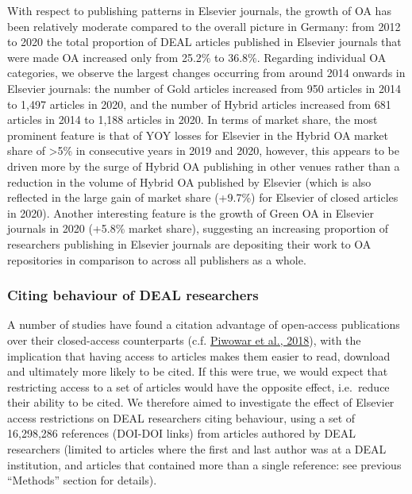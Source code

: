 \documentclass[
]{article}
\begin{document}
With respect to publishing patterns in Elsevier journals, the growth of OA has been relatively moderate compared to the overall picture in Germany: from 2012 to 2020 the total proportion of DEAL articles published in Elsevier journals that were made OA increased only from 25.2\% to 36.8\%. Regarding individual OA categories, we observe the largest changes occurring from around 2014 onwards in Elsevier journals: the number of Gold articles increased from 950 articles in 2014 to 1,497 articles in 2020, and the number of Hybrid articles increased from 681 articles in 2014 to 1,188 articles in 2020. In terms of market share, the most prominent feature is that of YOY losses for Elsevier in the Hybrid OA market share of \textgreater5\% in consecutive years in 2019 and 2020, however, this appears to be driven more by the surge of Hybrid OA publishing in other venues rather than a reduction in the volume of Hybrid OA published by Elsevier (which is also reflected in the large gain of market share (+9.7\%) for Elsevier of closed articles in 2020). Another interesting feature is the growth of Green OA in Elsevier journals in 2020 (+5.8\% market share), suggesting an increasing proportion of researchers publishing in Elsevier journals are depositing their work to OA repositories in comparison to across all publishers as a whole.

\hypertarget{citing-behaviour-of-deal-researchers}{%
\subsubsection{Citing behaviour of DEAL researchers}\label{citing-behaviour-of-deal-researchers}}

A number of studies have found a citation advantage of open-access publications over their closed-access counterparts (c.f. \href{https://doi.org/10.7717/peerj.4375}{Piwowar et al., 2018}), with the implication that having access to articles makes them easier to read, download and ultimately more likely to be cited. If this were true, we would expect that restricting access to a set of articles would have the opposite effect, i.e.~reduce their ability to be cited. We therefore aimed to investigate the effect of Elsevier access restrictions on DEAL researchers citing behaviour, using a set of 16,298,286 references (DOI-DOI links) from articles authored by DEAL researchers (limited to articles where the first and last author was at a DEAL institution, and articles that contained more than a single reference: see previous ``Methods'' section for details).
\end{document}
